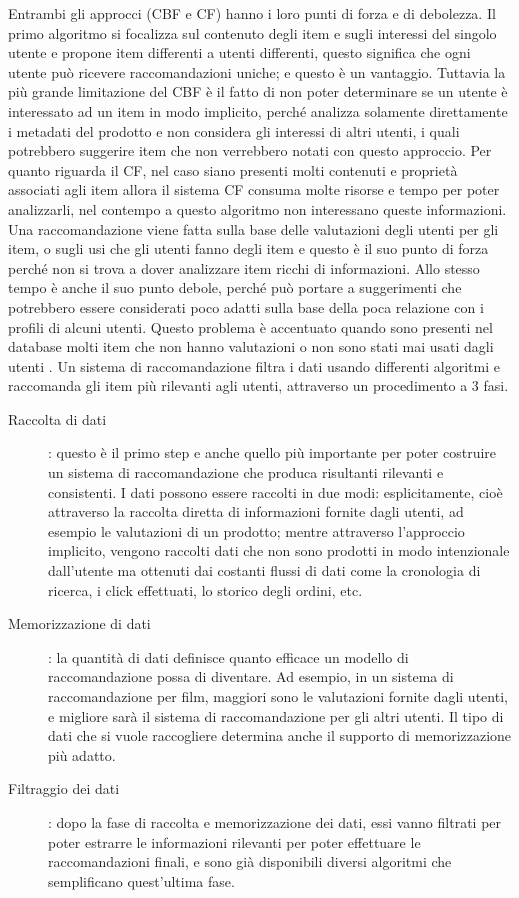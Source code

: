 Entrambi gli approcci (CBF e CF) hanno i loro punti di forza e di debolezza. Il primo algoritmo si focalizza sul contenuto degli item e
sugli interessi del singolo utente e propone item differenti a utenti differenti, questo significa che ogni utente può ricevere 
raccomandazioni uniche; e questo è un vantaggio. 
Tuttavia la più grande limitazione del CBF è il fatto di non poter determinare se un utente è interessato ad un item in modo implicito,
perché analizza solamente direttamente i metadati del prodotto e non considera gli interessi di altri utenti, i quali potrebbero 
suggerire item che non verrebbero notati con questo approccio.
Per quanto riguarda il CF, nel caso siano presenti molti contenuti e proprietà associati agli item allora il sistema CF consuma molte 
risorse e tempo per poter analizzarli, nel contempo a questo algoritmo non interessano queste informazioni. Una raccomandazione 
viene fatta sulla base delle valutazioni degli utenti per gli item, o sugli usi che gli utenti fanno degli item e questo è il suo punto 
di forza perché non si trova a dover analizzare item ricchi di informazioni. Allo stesso tempo è anche il suo punto debole, perché può
portare a suggerimenti che potrebbero essere considerati poco adatti sulla base della poca relazione con i profili di alcuni utenti. 
Questo problema è accentuato quando sono presenti nel database molti item che non hanno valutazioni o non sono stati mai usati dagli 
utenti \cite{model-based-approach-for-collaborative-filtering}.
\vspace{0.5 cm}
\hfill\break
Un sistema di raccomandazione filtra i dati usando differenti algoritmi e raccomanda gli item più rilevanti agli utenti, attraverso 
un procedimento a 3 fasi.
\begin{description}
    \item[Raccolta di dati]: questo è il primo step e anche quello più importante per poter costruire un sistema di 
    raccomandazione che produca risultanti rilevanti e consistenti. I dati possono essere raccolti in due modi: esplicitamente, 
    cioè attraverso la raccolta diretta di informazioni fornite dagli utenti, ad esempio le valutazioni di un prodotto; mentre 
    attraverso l'approccio implicito, vengono raccolti dati che non sono prodotti in modo intenzionale dall'utente ma ottenuti 
    dai costanti flussi di dati come la cronologia di ricerca, i click effettuati, lo storico degli ordini, etc.
    \item[Memorizzazione di dati]: la quantità di dati definisce quanto efficace un modello di raccomandazione possa di 
    diventare. Ad esempio, in un sistema di raccomandazione per film, maggiori sono le valutazioni fornite dagli utenti, e 
    migliore sarà il sistema di raccomandazione per gli altri utenti. Il tipo di dati che si vuole raccogliere determina
    anche il supporto di memorizzazione più adatto.   
    \item[Filtraggio dei dati]: dopo la fase di raccolta e memorizzazione dei dati, essi vanno filtrati per poter estrarre 
    le informazioni rilevanti per poter effettuare le raccomandazioni finali, e sono già disponibili diversi algoritmi che 
    semplificano quest'ultima fase. 
\end{description}

